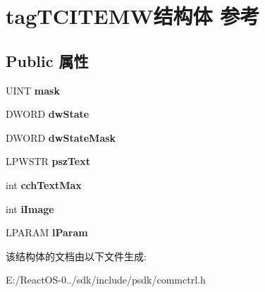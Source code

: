 \hypertarget{structtag_t_c_i_t_e_m_w}{}\section{tag\+T\+C\+I\+T\+E\+M\+W结构体 参考}
\label{structtag_t_c_i_t_e_m_w}
\subsection*{Public 属性}
\begin{DoxyCompactItemize}
\item 
\mbox{\label{structtag_t_c_i_t_e_m_w_aa2b60707c253eb18e47c162729dc04c1}} 
U\+I\+NT {\bfseries mask}
\item 
\mbox{\label{structtag_t_c_i_t_e_m_w_a306500748c47468125222012bc275474}} 
D\+W\+O\+RD {\bfseries dw\+State}
\item 
\mbox{\label{structtag_t_c_i_t_e_m_w_a7f538b40b09a5cf9032d1b6bfa345e3b}} 
D\+W\+O\+RD {\bfseries dw\+State\+Mask}
\item 
\mbox{\label{structtag_t_c_i_t_e_m_w_a3af331d707711a63df3148b474e27066}} 
L\+P\+W\+S\+TR {\bfseries psz\+Text}
\item 
\mbox{\label{structtag_t_c_i_t_e_m_w_a8464be9998fac61f70dacd4c28b16a91}} 
int {\bfseries cch\+Text\+Max}
\item 
\mbox{\label{structtag_t_c_i_t_e_m_w_a543239c0c33bdc0411bdb54e70cac65c}} 
int {\bfseries i\+Image}
\item 
\mbox{\label{structtag_t_c_i_t_e_m_w_a145ff2df6799d6b7c99641d75cc00540}} 
L\+P\+A\+R\+AM {\bfseries l\+Param}
\end{DoxyCompactItemize}


该结构体的文档由以下文件生成\+:\begin{DoxyCompactItemize}
\item 
E\+:/\+React\+O\+S-\/0../sdk/include/psdk/commctrl.\+h\end{DoxyCompactItemize}
